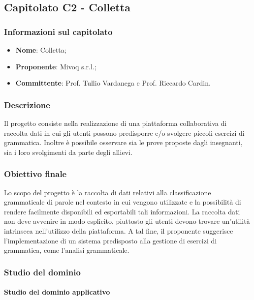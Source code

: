 \subsection{Capitolato C2 - Colletta}
\subsubsection{Informazioni sul capitolato}
\begin{itemize}
	\item \textbf{Nome}: Colletta;
	\item \textbf{Proponente}: Mivoq s.r.l.;
	\item \textbf{Committente}: Prof. Tullio Vardanega e Prof. Riccardo Cardin.
\end{itemize}
\subsubsection{Descrizione}

Il progetto consiste nella realizzazione di una piattaforma collaborativa di
raccolta dati in cui gli utenti possono predisporre e/o svolgere piccoli
esercizi di grammatica. Inoltre è possibile osservare sia le prove proposte
dagli insegnanti, sia i loro svolgimenti da parte degli allievi.
\subsubsection{Obiettivo finale}

Lo scopo del progetto è la raccolta di dati relativi alla classificazione
grammaticale di parole nel contesto in cui vengono utilizzate e la possibilità
di rendere facilmente disponibili ed esportabili tali informazioni. La raccolta
dati non deve avvenire in modo esplicito, piuttosto gli utenti devono trovare
un'utilità intrinseca nell'utilizzo della piattaforma. A tal fine, il
proponente suggerisce l'implementazione di un sistema predisposto alla gestione
di esercizi di grammatica, come l'analisi grammaticale. 
\subsubsection{Studio del dominio}
\paragraph{Studio del dominio applicativo} \mbox{} \\ 

